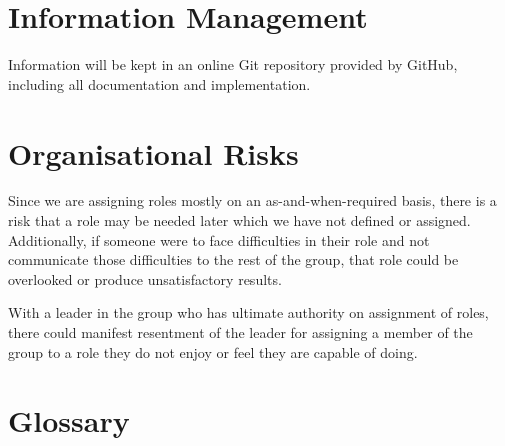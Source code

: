 \documentclass{l3deliverable}
\begin{document}

\section{Information Management}

Information will be kept in an online Git repository provided by GitHub,
including all documentation and implementation.


\section{Organisational Risks}

Since we are assigning roles mostly on an as-and-when-required basis, there is
a risk that a role may be needed later which we have not defined or assigned.
Additionally, if someone were to face difficulties in their role and not 
communicate those difficulties to the rest of the group, that role could be 
overlooked or produce unsatisfactory results.

With a leader in the group who has ultimate authority on assignment of roles,
there could manifest resentment of the leader for assigning a member of the 
group to a role they do not enjoy or feel they are capable of doing.


\appendix

\section{Glossary}
\end{document}
